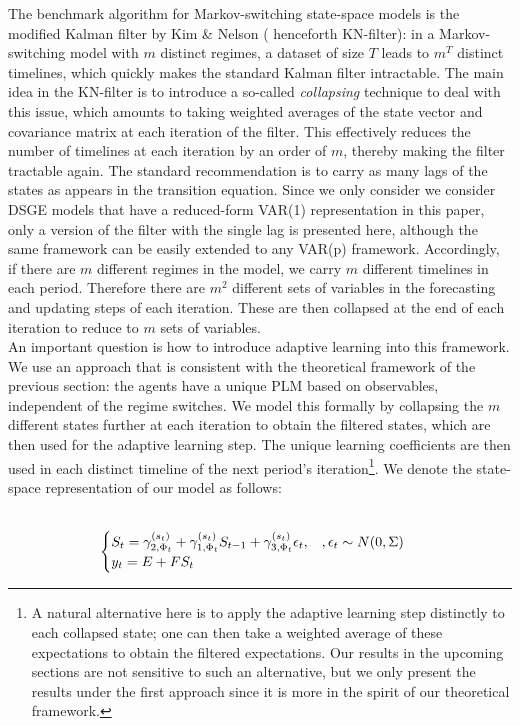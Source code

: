 \documentclass[12pt,reqno]{article}
\numberwithin{equation}{section}
\begin{document}
The benchmark algorithm for Markov-switching state-space models is the modified Kalman filter by  Kim \& Nelson ( henceforth KN-filter): in a Markov-switching model with $m $ distinct regimes, a dataset of size $T$ leads to $m^T$ distinct timelines, which quickly makes the standard Kalman filter intractable. The main idea in the KN-filter is to introduce a so-called \textit{collapsing} technique to deal with this issue, which amounts to taking weighted averages of the state vector and covariance matrix at each iteration of the filter. This effectively reduces the number of timelines at each iteration by an order of $m$, thereby making the filter tractable again. The standard recommendation is to carry as many lags of the states as appears in the transition equation. Since we only consider we consider DSGE models that have a reduced-form VAR(1) representation in this paper, only a version of the filter with the single lag is presented here, although the same framework can be easily extended to any VAR(p) framework. Accordingly,  if there are $ m $ different regimes in the model, we carry $m $ different timelines in each period. Therefore there are $m^2$ different sets of variables in the forecasting and updating steps of each iteration. These are then collapsed at the end of each iteration to reduce to $m $ sets of variables. \\
\noindent
An important question is how to introduce adaptive learning into this framework. We use an approach that is consistent with the theoretical framework of the previous section: the agents have a unique PLM based on observables, independent of the regime switches. We model this formally by collapsing the $m $ different states further at each iteration to obtain the {filtered states}, which are then used for the adaptive learning step. The unique learning coefficients are then used in each distinct timeline of the next period’s iteration\footnote{A natural alternative here is to apply the adaptive learning step distinctly to each collapsed state; one can then take a weighted average of these expectations to obtain the {filtered expectations}. Our results in the upcoming sections are not sensitive to such an alternative, but we only present the results under the first approach since it is more in the spirit of our theoretical framework.}. We denote the state-space representation of our model as follows: \\\

$$
\begin{cases}
S_t = \gamma_{2,\Phi_t}^{(s_t)} + \gamma_{1,\Phi_t}^{(s_t)} S_{t-1} + \gamma_{3,\Phi_t}^{(s_t)} \epsilon_t, \hspace{3 mm}, \epsilon_t \sim N(0, \Sigma) \\
y_t = E+ F S_t \\
\end{cases}
$$
\end{document}
